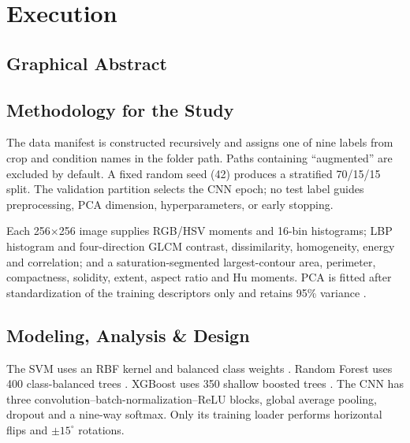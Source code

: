 \chapter{Execution}
\section{Graphical Abstract}
\begin{center}
\end{center}
\section{Methodology for the Study}
The data manifest is constructed recursively and assigns one of nine labels from crop and condition names in the folder path. Paths containing ``augmented'' are excluded by default. A fixed random seed (42) produces a stratified 70/15/15 split. The validation partition selects the CNN epoch; no test label guides preprocessing, PCA dimension, hyperparameters, or early stopping.

Each 256$\times$256 image supplies RGB/HSV moments and 16-bin histograms; LBP histogram and four-direction GLCM contrast, dissimilarity, homogeneity, energy and correlation; and a saturation-segmented largest-contour area, perimeter, compactness, solidity, extent, aspect ratio and Hu moments. PCA is fitted after standardization of the training descriptors only and retains 95\% variance \cite{jolliffe}.
\section{Modeling, Analysis \& Design}
The SVM uses an RBF kernel and balanced class weights \cite{cortes}. Random Forest uses 400 class-balanced trees \cite{breiman}. XGBoost uses 350 shallow boosted trees \cite{chen}. The CNN has three convolution--batch-normalization--ReLU blocks, global average pooling, dropout and a nine-way softmax. Only its training loader performs horizontal flips and $\pm15^{\circ}$ rotations.
